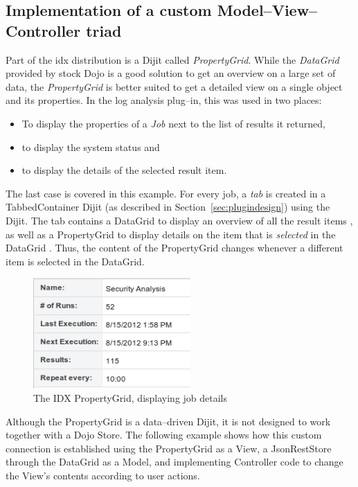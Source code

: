 \subsection{Implementation of a custom Model--View--Controller triad}
\label{sec:customview}
Part of the \ac{idx} distribution is a Dijit called \emph{PropertyGrid}. While the \emph{DataGrid} provided by stock Dojo is a good solution to get an overview on a large set of data, the \emph{PropertyGrid} is better suited to get a detailed view on a single object and its properties. In the log analysis plug--in, this was used in two places:
\begin{itemize}
	\item To display the properties of a \emph{Job} next to the list of results it returned,
	\item to display the system status and
	\item to display the details of the selected result item.
\end{itemize}
The last case is covered in this example. For every job, a \emph{tab} is created in a TabbedContainer Dijit (as described in Section~\ref{sec:plugindesign}) using the  Dijit. The tab contains a DataGrid to display an overview of all the result items , as well as a PropertyGrid to display details on the item that is \emph{selected} in the DataGrid . Thus, the content of the PropertyGrid changes whenever a different item is selected in the DataGrid.
\begin{figure}[H]
	\centering
	\includegraphics[width=6cm]{screens/propertygrid.png}
	\caption{The IDX PropertyGrid, displaying job details}
	\label{fig:propertygrid}
\end{figure}
Although the PropertyGrid is a data--driven Dijit, it is not designed to work together with a Dojo Store. The following example shows how this custom connection is established using the PropertyGrid as a View, a JsonRestStore through the DataGrid as a Model, and implementing Controller code to change the View's contents according to user actions.


